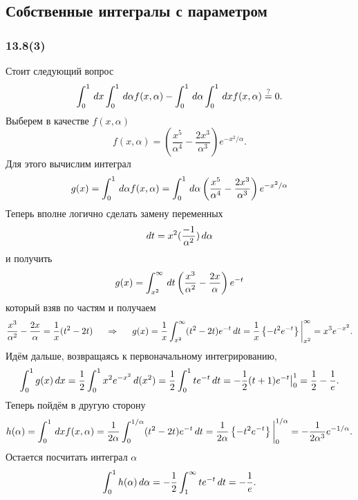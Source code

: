 \subsection{Собственные интегралы с параметром}


\subsubsection{13.8(3)}


Стоит следующий вопрос
\begin{equation*}
    \int_0^1 \, d x \int_0^1 \, d \alpha f(x, \alpha) - \int_0^1 \, d \alpha \int_0^1 \, d x f(x, \alpha) \overset{?}{=} 0.
\end{equation*}
Выберем в качестве $f(x, \alpha)$ 
\begin{equation*}
    f(x, \alpha) = \left(
        \frac{x^5}{\alpha^4} - \frac{2 x^3}{\alpha^3}
    \right) e^{-x^2/\alpha}.
\end{equation*}
Для этого вычислим интеграл
\begin{equation*}
    g(x) = \int_0^1 \, d \alpha f(x, \alpha) = \int_0^1 \, d \alpha \left(
        \frac{x^5}{\alpha^4} - \frac{2 x^3}{\alpha^3}
    \right) e^{-x^2/\alpha}
\end{equation*}
Теперь вполне логично сделать замену переменных
\begin{equation*}
    d t = x^2 (\frac{-1}{\alpha^2}) \, d \alpha 
\end{equation*}
и получить
\begin{equation*}
    g(x) = \int_{x^2}^{\infty} \, d t \left(
        \frac{x^3}{\alpha^2} - \frac{2 x}{\alpha}
    \right) e^{-t}
\end{equation*}
который взяв по частям и получаем
\begin{equation*}
    \frac{x^3}{\alpha^2} - \frac{2 x}{\alpha} = \frac{1}{x} (t^2 - 2t)
    \hspace{0.5cm} \Rightarrow \hspace{0.5cm}
    g(x) = \frac{1}{x} \int_{x^2}^{\infty} (t^2 - 2t) e^{-t} \, d t = 
    \frac{1}{x} \left\{-t^2 e^{-t}\right\} \bigg|_{x^2}^{\infty} = x^3 e^{-x^2}.
\end{equation*}
Идём дальше, возвращаясь к первоначальному интегрированию,
\begin{equation*}
    \int_0^1 g(x) \, d x = \frac{1}{2} \int_0^1 x^2 e^{-x^2} \, d (x^2) = 
    \frac{1}{2} \int_0^1 t e^{-t} \, d t = - \frac{1}{2} (t+1) e^{-t} \big|_0^1 = \frac{1}{2}-\frac{1}{e}.
\end{equation*}
Теперь пойдём в другую сторону
\begin{equation*}
    h(\alpha) = \int_0^1 \, d x f(x, \alpha) = \frac{1}{2\alpha} \int_0^{1/\alpha} (t^2 - 2t) e^{-t} \, d t = \frac{1}{2\alpha} \left\{
        - t^2 e^{-t}
    \right\}\bigg|^{1/\alpha}_0 = - \frac{1}{2\alpha^3} e^{-1/\alpha}.
\end{equation*}
Остается посчитать интеграл $\alpha$ 
\begin{equation*}
    \int_0^1 h(\alpha) \, d \alpha = - \frac{1}{2} \int_1^{\infty} t e^{-t} \, d t = - \frac{1}{e}.
\end{equation*}



